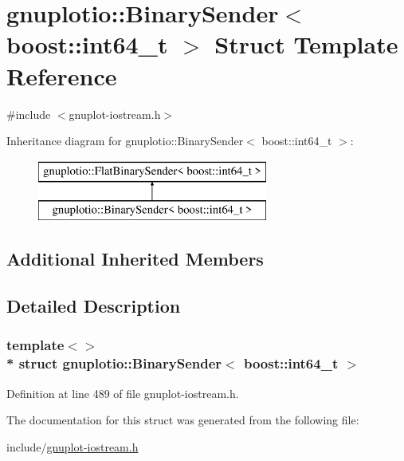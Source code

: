 \hypertarget{structgnuplotio_1_1_binary_sender_3_01boost_1_1int64__t_01_4}{}\section{gnuplotio\+:\+:Binary\+Sender$<$ boost\+:\+:int64\+\_\+t $>$ Struct Template Reference}
\label{structgnuplotio_1_1_binary_sender_3_01boost_1_1int64__t_01_4}


{\ttfamily \#include $<$gnuplot-\/iostream.\+h$>$}

Inheritance diagram for gnuplotio\+:\+:Binary\+Sender$<$ boost\+:\+:int64\+\_\+t $>$\+:\begin{figure}[H]
\begin{center}
\leavevmode
\includegraphics[height=2.000000cm]{structgnuplotio_1_1_binary_sender_3_01boost_1_1int64__t_01_4}
\end{center}
\end{figure}
\subsection*{Additional Inherited Members}


\subsection{Detailed Description}
\subsubsection*{template$<$$>$\\*
struct gnuplotio\+::\+Binary\+Sender$<$ boost\+::int64\+\_\+t $>$}



Definition at line 489 of file gnuplot-\/iostream.\+h.



The documentation for this struct was generated from the following file\+:\begin{DoxyCompactItemize}
\item 
include/\hyperlink{gnuplot-iostream_8h}{gnuplot-\/iostream.\+h}\end{DoxyCompactItemize}

